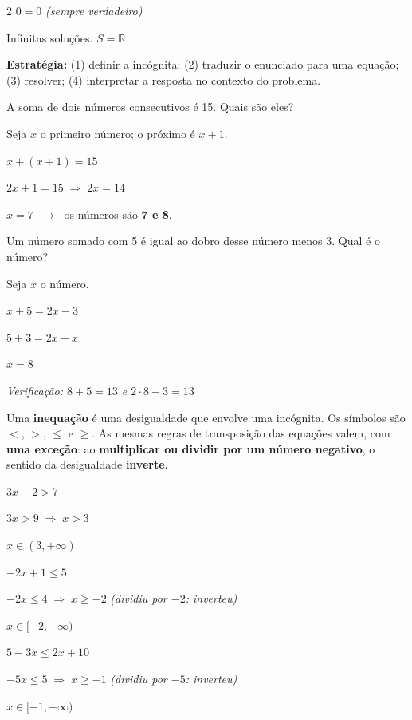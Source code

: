 \documentclass[12pt]{article}
\begin{document}
\begin{multicols}{2}
$0 = 0$ \hfill {\small\textit{(sempre verdadeiro)}}

Infinitas soluções. $S = \mathbb{R}$


\textbf{Estratégia:} (1) definir a incógnita; (2) traduzir o enunciado para uma equação; (3) resolver; (4) interpretar a resposta no contexto do problema.


A soma de dois números consecutivos é 15. Quais são eles?

Seja $x$ o primeiro número; o próximo é $x + 1$.

$x + (x + 1) = 15$

$2x + 1 = 15 \;\Rightarrow\; 2x = 14$

$x = 7$ $\;\rightarrow\;$ os números são \textbf{7 e 8}.

\vspace{6pt}


Um número somado com 5 é igual ao dobro desse número menos 3. Qual é o número?

Seja $x$ o número.

$x + 5 = 2x - 3$

$5 + 3 = 2x - x$

$x = 8$

\textit{Verificação: $8+5=13$ e $2\cdot8-3=13$ \checkmark}


Uma \textbf{inequação} é uma desigualdade que envolve uma incógnita. Os símbolos são
$<$, $>$, $\leq$ e $\geq$. As mesmas regras de transposição das equações valem, com
\textbf{uma exceção}: ao \textbf{multiplicar ou dividir por um número negativo}, o
sentido da desigualdade \textbf{inverte}.

 $3x - 2 > 7$

$3x > 9 \;\Rightarrow\; x > 3$

$\boxed{x \in (3, +\infty)}$

 $-2x + 1 \leq 5$

$-2x \leq 4 \;\Rightarrow\; x \geq -2$ \hfill {\small\textit{(dividiu por $-2$: inverteu)}}

$\boxed{x \in [-2, +\infty)}$

 $5 - 3x \leq 2x + 10$

$-5x \leq 5 \;\Rightarrow\; x \geq -1$ \hfill {\small\textit{(dividiu por $-5$: inverteu)}}

$\boxed{x \in [-1, +\infty)}$


\end{multicols}


\end{document}
